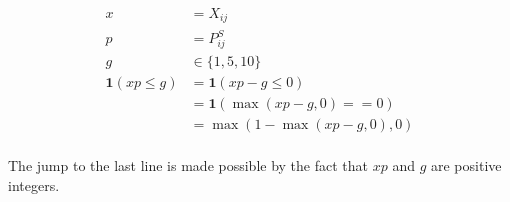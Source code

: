 \begin{align}
x &= X_{ij} \\
p &= P^S_{ij} \\
g &\in \{1,5,10\} \\
\mathbf{1}(xp \leq g) &= \mathbf{1}(xp - g \leq 0) \\
&=  \mathbf{1}(\max(xp - g , 0) == 0) \\
&=  \max(1 - \max(xp - g , 0), 0) \\
\end{align}

The jump to the last line is made possible by the fact that $xp$ and $g$ are positive integers.
